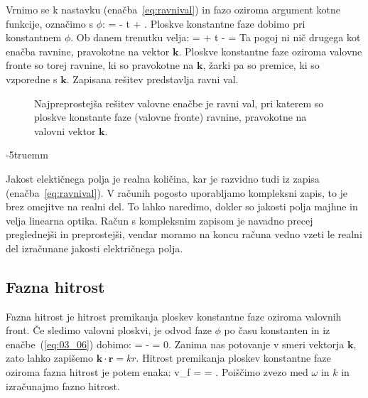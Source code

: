 Vrnimo se k nastavku (enačba~\ref{eq:ravnival}) in fazo oziroma
argument kotne funkcije, označimo s $\phi$:
\beq
\phi = \cdot {} - \omega t + \delta.
\label{eq:03_06}
\eeq
Ploskve konstantne faze dobimo pri konstantnem $\phi$. Ob danem trenutku velja:
\beq
{}\cdot {} = \phi + \omega t - \delta = 
\label{eq:03_08}
\eeq
Ta pogoj ni nič drugega kot enačba ravnine, pravokotne na vektor $\mathbf{k}$. Ploskve konstantne faze
oziroma valovne fronte so torej ravnine, ki so pravokotne na $\mathbf{k}$, žarki pa so premice, ki 
so vzporedne s $\mathbf{k}$. Zapisana rešitev predstavlja ravni val.
\begin{figure}[ht]
\centering
\def\svgwidth{90truemm} 

\caption{Najpreprostejša rešitev valovne enačbe je ravni val, pri katerem so ploskve konstante
faze (valovne fronte) ravnine, pravokotne na valovni vektor $\mathbf{k}$.}
\label{fig:03_ravnival}
\end{figure}
\vglue-5truemm
\begin{remark}
Jakost elektičnega polja je realna količina, kar je razvidno tudi iz zapisa (enačba~\ref{eq:ravnival}). 
V računih pogosto uporabljamo kompleksni zapis, to je brez omejitve na realni del. To lahko 
naredimo, dokler so jakosti polja majhne in velja linearna optika. Račun s kompleksnim zapisom
je navadno precej preglednejši in preprostejši, vendar moramo na koncu računa vedno vzeti le
realni del izračunane jakosti električnega polja. 
\end{remark}

\subsection*{Fazna hitrost}
Fazna hitrost je hitrost premikanja ploskev konstantne faze oziroma valovnih front. 
Če sledimo valovni ploskvi, je odvod faze $\phi$ po času konstanten in iz enačbe~(\ref{eq:03_06}) 
dobimo:
\beq
{}= \cdot {} - \omega = 0.
\label{eq:03_09}
\eeq
Zanima nas potovanje v smeri vektorja $\mathbf{k}$, 
zato lahko zapišemo $\mathbf{k}\cdot \mathbf{r} = kr$. Hitrost premikanja ploskev
konstantne faze oziroma fazna hitrost je potem enaka:
\beq
v_f =  = .
\label{eq:03_10}
\eeq
Poiščimo zvezo med $\omega$ in $k$ in izračunajmo fazno hitrost.

